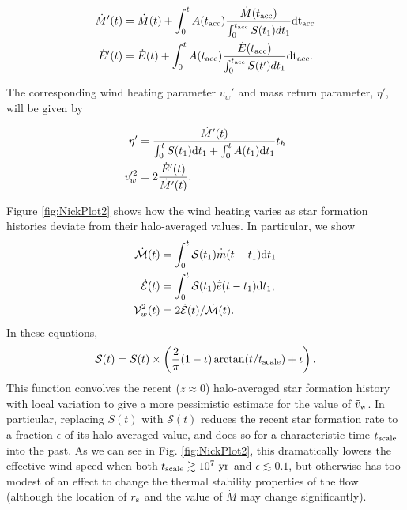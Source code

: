 \begin{align}
\dot{M} '(t)&=\dot{M}(t)+\int_{0}^{t} A(t_{\rm acc}) \frac{\dot{M}(t_{\rm acc})}
{\int_{0}^{t_{\rm acc}} S(t_1) dt_1} {\rm dt_{ acc}}\\
\dot{E}'(t)&=\dot{E}(t)+\int_{0}^{t} A(t_{\rm acc}) \frac{\dot{E}(t_{\rm acc})}
{\int_{0}^{t_{\rm acc}} S(t') dt_1} {\rm dt_{acc}}.
\end{align}

The corresponding wind heating parameter $v_w'$ and mass return
parameter, $\eta'$, will be given by

\begin{align}
\eta'&=\frac{\dot{M}'(t)}{\int_0^t S(t_1) {\rm d}t_1+\int_0^t A(t_1) {\rm
    d}t_1} t_h\\
v_w'^2&=2 \frac{\dot{E}'(t)}{\dot{M}'(t)}.
\end{align}

Figure \ref{fig:NickPlot2} shows how the wind heating varies as star formation histories deviate from their halo-averaged values.  In particular, we show
\begin{align} 
  \dot{\mathcal{M}}(t) &= \int_0^t \mathcal{S}(t_1) \dot{\bar{m}}(t-t_1){\rm
      d}t_1\\
  \dot{\mathcal{E}}(t) &= \int_0^t \mathcal{S}(t_1) \dot{\bar{e}}(t-t_1){\rm
      d}t_1,\\
  \mathcal{V}_w^2(t) &=2 \dot{\mathcal{E}}(t)/\dot{\mathcal{M}}(t).
\end{align}
In these equations, 
\begin{equation}
\mathcal{S}(t) = S(t) \times \left(\frac{2}{\pi}(1-\iota)\arctan(t/t_{\rm scale}) + \iota \right).
\end{equation}
This function convolves the recent ($z \approx 0$) halo-averaged star formation history with local variation to give a more pessimistic estimate for the value of $\tilde{v}_{\rm w}$.  In particular, replacing $S(t)$ with $\mathcal{S}(t)$ reduces the recent star formation rate to a fraction $\epsilon$ of its halo-averaged value, and does so for a characteristic time $t_{\rm scale}$ into the past.  As we can see in Fig. \ref{fig:NickPlot2}, this dramatically lowers the effective wind speed when both $t_{\rm scale} \gtrsim 10^7 ~{\rm yr}$ and $\epsilon \lesssim 0.1$, but otherwise has too modest of an effect to change the thermal stability properties of the flow (although the location of $r_{\rm s}$ and the value of $\dot{M}$ may change significantly).


